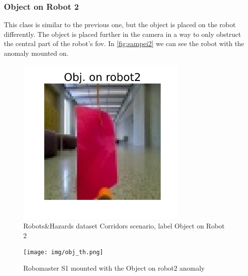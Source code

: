        \subsubsection*{Object on Robot 2}
            This class is similar to the previous one, but the object is placed on the robot differently. The object is placed further in the camera in a way to only obstruct the central part of the robot's \acrshort{fov}. In \autoref{fig:sampei2} we can see the robot with the anomaly mounted on.
            \begin{figure}[H]
                \centering
                \centerline{\includegraphics[width=0.75\textwidth]{img/labels/obj. on robot2.png}}
                \caption{Robots\&Hazards dataset Corridors scenario, label Object on Robot 2}
                \label{fig:label-obj-on-robot2}
            \end{figure}
            
            \begin{figure}[H]
                \centering
                \centerline{\texttt{[image: img/obj\_th.png]}}
                \caption{Robomaster S1 mounted with the Object on robot2 anomaly}
                \label{fig:sampei2}
            \end{figure}
        
